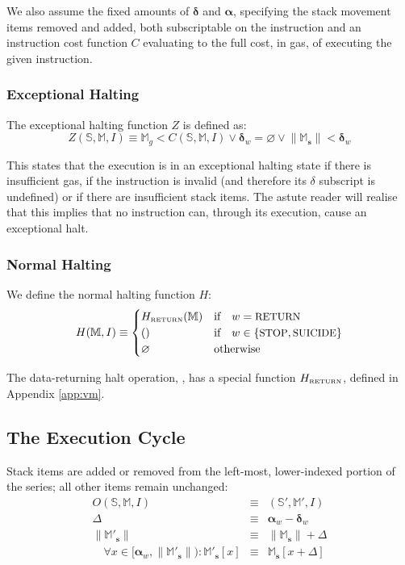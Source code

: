\documentclass[9pt,oneside]{amsart}
\begin{document}
\begin{multicols}{2}
We also assume the fixed amounts of $\mathbf{\delta}$ and $\mathbf{\alpha}$, specifying the stack movement items removed and added, both subscriptable on the instruction and an instruction cost function $C$ evaluating to the full cost, in gas, of executing the given instruction.

\subsubsection{Exceptional Halting}

The exceptional halting function $Z$ is defined as:
\begin{equation}
Z(\mathbb{S}, \mathbb{M}, I) \equiv \mathbb{M}_g < C(\mathbb{S}, \mathbb{M}, I) \vee \mathbf{\delta}_w = \varnothing \vee \lVert\mathbb{M}_\mathbf{s}\rVert < \mathbf{\delta}_w
\end{equation}

This states that the execution is in an exceptional halting state if there is insufficient gas, if the instruction is invalid (and therefore its $\delta$ subscript is undefined) or if there are insufficient stack items. The astute reader will realise that this implies that no instruction can, through its execution, cause an exceptional halt.

\subsubsection{Normal Halting}

We define the normal halting function $H$:
\begin{equation}
H(\mathbb{M}, I) \equiv \begin{cases}
H_{\text{\tiny RETURN}}(\mathbb{M}) & \text{if} \quad w = \text{\small RETURN} \\
() & \text{if} \quad w \in \{ \text{\small STOP}, \text{\small SUICIDE} \} \\
\varnothing & \text{otherwise}
\end{cases}
\end{equation}

The data-returning halt operation, , has a special function $H_{\text{\tiny RETURN}}$, defined in Appendix \ref{app:vm}.

\subsection{The Execution Cycle}

Stack items are added or removed from the left-most, lower-indexed portion of the series; all other items remain unchanged:
\begin{eqnarray}
O(\mathbb{S}, \mathbb{M}, I) & \equiv & (\mathbb{S}', \mathbb{M}', I) \\
\Delta & \equiv & \mathbf{\alpha}_w - \mathbf{\delta}_w \\
\lVert\mathbb{M}'_\mathbf{s}\rVert & \equiv & \lVert\mathbb{M}_\mathbf{s}\rVert + \Delta \\
\quad \forall x \in [\mathbf{\alpha}_w, \lVert\mathbb{M}'_\mathbf{s}\rVert): \mathbb{M}'_\mathbf{s}[x] & \equiv & \mathbb{M}_\mathbf{s}[x+\Delta]
\end{eqnarray}


\end{multicols}
\end{document}

